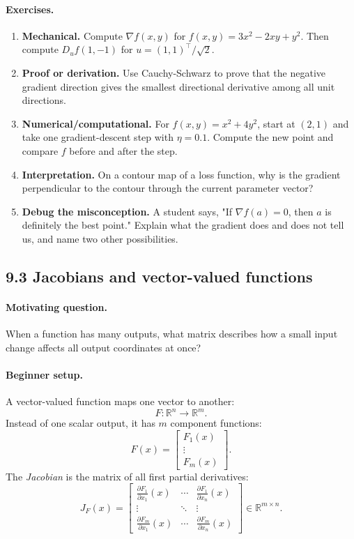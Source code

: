 \paragraph{Exercises.}
\begin{enumerate}[label=\textbf{9.2.\arabic*.}, leftmargin=*]
\item \textbf{Mechanical.} Compute \(\nabla f(x,y)\) for \(f(x,y)=3x^2-2xy+y^2\). Then compute \(D_u f(1,-1)\) for \(u=(1,1)^\top/\sqrt{2}\).
\item \textbf{Proof or derivation.} Use Cauchy-Schwarz to prove that the negative gradient direction gives the smallest directional derivative among all unit directions.
\item \textbf{Numerical/computational.} For \(f(x,y)=x^2+4y^2\), start at \((2,1)\) and take one gradient-descent step with \(\eta=0.1\). Compute the new point and compare \(f\) before and after the step.
\item \textbf{Interpretation.} On a contour map of a loss function, why is the gradient perpendicular to the contour through the current parameter vector?
\item \textbf{Debug the misconception.} A student says, "If \(\nabla f(a)=0\), then \(a\) is definitely the best point." Explain what the gradient does and does not tell us, and name two other possibilities.
\end{enumerate}

\subsection{9.3 Jacobians and vector-valued functions}

\paragraph{Motivating question.}
When a function has many outputs, what matrix describes how a small input change affects all output coordinates at once?

\paragraph{Beginner setup.}
A vector-valued function maps one vector to another:
\[
F:\mathbb{R}^n\to\mathbb{R}^m.
\]
Instead of one scalar output, it has \(m\) component functions:
\[
F(x)=
\begin{bmatrix}
F_1(x)\\
\vdots\\
F_m(x)
\end{bmatrix}.
\]
The \emph{Jacobian} is the matrix of all first partial derivatives:
\[
J_F(x)=
\begin{bmatrix}
\frac{\partial F_1}{\partial x_1}(x)&\cdots&\frac{\partial F_1}{\partial x_n}(x)\\
\vdots&\ddots&\vdots\\
\frac{\partial F_m}{\partial x_1}(x)&\cdots&\frac{\partial F_m}{\partial x_n}(x)
\end{bmatrix}
\in\mathbb{R}^{m\times n}.
\]

